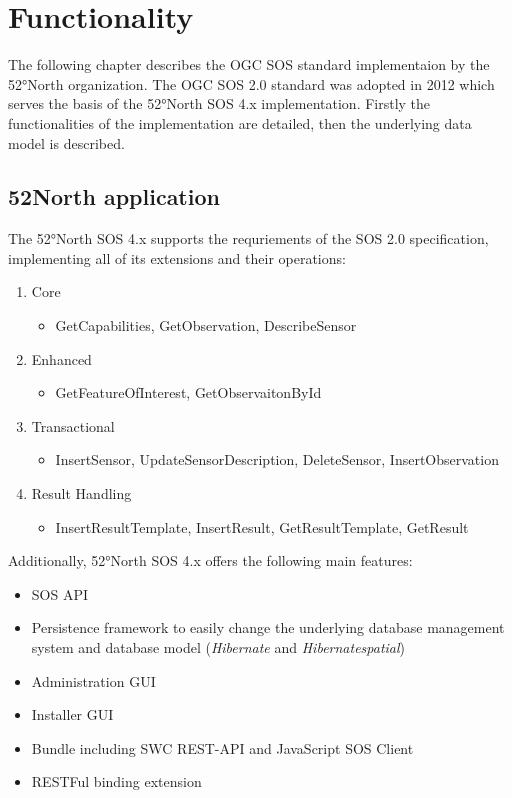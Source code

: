 \chapter{Functionality}
The following chapter describes the OGC SOS standard implementaion by the
52°North organization. The OGC SOS 2.0 standard was adopted in 2012 which
serves the basis of the 52°North SOS 4.x implementation. Firstly the
functionalities of the implementation are detailed, then the underlying data model is described.

\section{52North application}
The 52°North SOS 4.x supports the requriements of the SOS 2.0 specification,
implementing all of its extensions and their operations:
\begin{enumerate}
    \item Core
        \begin{itemize}
            \item GetCapabilities, GetObservation, DescribeSensor
        \end{itemize}
    \item Enhanced
        \begin{itemize}
            \item GetFeatureOfInterest, GetObservaitonById
        \end{itemize}
    \item Transactional
        \begin{itemize}
            \item InsertSensor, UpdateSensorDescription, DeleteSensor,
            InsertObservation
        \end{itemize}
    \item Result Handling
        \begin{itemize}
            \item InsertResultTemplate, InsertResult, GetResultTemplate,
            GetResult
        \end{itemize}
\end{enumerate}

Additionally, 52°North SOS 4.x offers the following main features:
\begin{itemize}
    \item SOS API
    \item Persistence framework to easily change the underlying database
    management system and database model (\textit{Hibernate} and
    \textit{Hibernatespatial})
    \item Administration GUI
    \item Installer GUI
    \item Bundle including SWC REST-API and JavaScript SOS Client
    \item RESTFul binding extension
\end{itemize}

